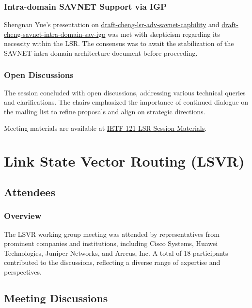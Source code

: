 \documentclass{article}
\begin{document}
\subsubsection{Intra-domain SAVNET Support via IGP}
Shengnan Yue's presentation on \href{https://datatracker.ietf.org/doc/html/draft-cheng-lsr-adv-savnet-capbility}{draft-cheng-lsr-adv-savnet-capbility} and \href{https://datatracker.ietf.org/doc/html/draft-cheng-savnet-intra-domain-sav-igp}{draft-cheng-savnet-intra-domain-sav-igp} was met with skepticism regarding its necessity within the LSR. The consensus was to await the stabilization of the SAVNET intra-domain architecture document before proceeding.

\subsubsection{Open Discussions}
The session concluded with open discussions, addressing various technical queries and clarifications. The chairs emphasized the importance of continued dialogue on the mailing list to refine proposals and align on strategic directions.

Meeting materials are available at \href{https://datatracker.ietf.org/meeting/121/session/lsr}{IETF 121 LSR Session Materials}.



\newpage

\section{Link State Vector Routing (LSVR)}

\subsection{Attendees}
\subsubsection{Overview}
The LSVR working group meeting was attended by representatives from prominent companies and institutions, including Cisco Systems, Huawei Technologies, Juniper Networks, and Arrcus, Inc. A total of 18 participants contributed to the discussions, reflecting a diverse range of expertise and perspectives.

\subsection{Meeting Discussions}
\end{document}
